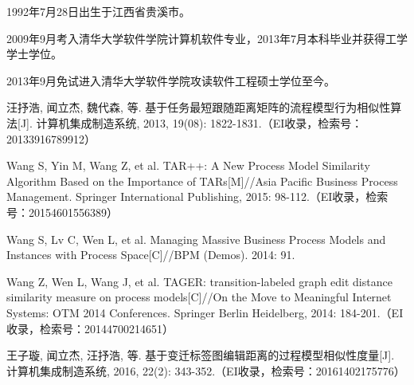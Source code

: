 
\begin{resume}


  1992年7月28日出生于江西省贵溪市。

  2009年9月考入清华大学软件学院计算机软件专业，2013年7月本科毕业并获得工学学士学位。

  2013年9月免试进入清华大学软件学院攻读软件工程硕士学位至今。


  \begin{publications}
    \item 汪抒浩, 闻立杰, 魏代森, 等. 基于任务最短跟随距离矩阵的流程模型行为相似性算法[J]. 计算机集成制造系统, 2013, 19(08): 1822-1831.（EI收录，检索号：20133916789912）
    \item Wang S, Yin M, Wang Z, et al. TAR++: A New Process Model Similarity Algorithm Based on the Importance of TARs[M]//Asia Pacific Business Process Management. Springer International Publishing, 2015: 98-112.（EI收录，检索号：20154601556389）
    \item Wang S, Lv C, Wen L, et al. Managing Massive Business Process Models and Instances with Process Space[C]//BPM (Demos). 2014: 91.
    \publicationskip
    \item Wang Z, Wen L, Wang J, et al. TAGER: transition-labeled graph edit distance similarity measure on process models[C]//On the Move to Meaningful Internet Systems: OTM 2014 Conferences. Springer Berlin Heidelberg, 2014: 184-201.（EI收录，检索号：20144700214651）
    \item 王子璇, 闻立杰, 汪抒浩, 等. 基于变迁标签图编辑距离的过程模型相似性度量[J]. 计算机集成制造系统, 2016, 22(2): 343-352.（EI收录，检索号：20161402175776）
  \end{publications}


\end{resume}
